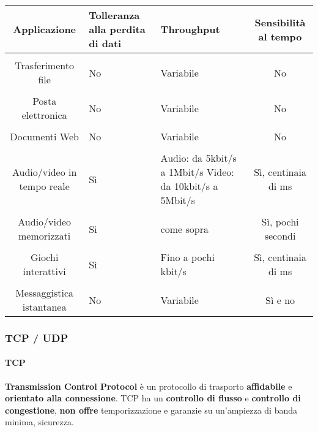             \begin{table}[H]
                \centering
                \begin{adjustbox}{max width=\textwidth}
                    \begin{tabular}{c p{7em} p{13em} c}
                        \textbf{Applicazione} & \textbf{Tolleranza alla perdita di dati} & \textbf{Throughput} & \textbf{Sensibilità al tempo} \\
                        \hline\\
                        Trasferimento file & No & Variabile & No \\
                        \hline\\
                        Posta elettronica & No & Variabile & No \\
                        \hline \\
                        Documenti Web & No & Variabile & No \\
                        \hline \\
                        Audio/video in tempo reale & Sì & Audio: da 5kbit/s a 1Mbit/s Video: da 10kbit/s a 5Mbit/s & Sì, centinaia di ms \\
                        \hline \\
                        Audio/video memorizzati & Si & come sopra & Sì, pochi secondi \\
                        \hline \\
                        Giochi interattivi & Sì & Fino a pochi kbit/s & Sì, centinaia di ms \\
                        \hline \\
                        Messaggistica istantanea & No & Variabile & Sì e no \\
                        \hline
                    \end{tabular}
                \end{adjustbox}
            \end{table}
        \subsubsection{TCP / UDP}
            \paragraph{TCP} \textbf{Transmission Control Protocol} è un protocollo di trasporto \textbf{affidabile} e \textbf{orientato alla connessione}. TCP ha un \textbf{controllo di flusso} e \textbf{controllo di congestione}, \textbf{non offre} temporizzazione e garanzie su un'ampiezza di banda minima, sicurezza.
